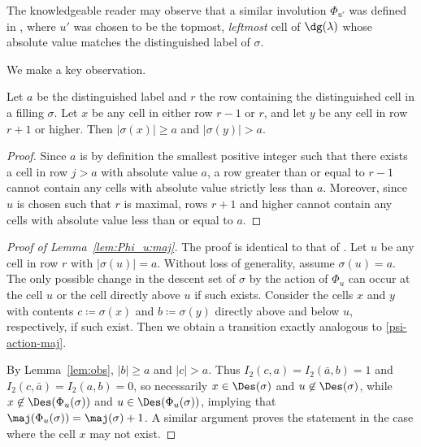 \begin{remark} 
The knowledgeable reader may observe that a similar involution $\Phi_{u'}$ was
defined in \cite[Section 5.2]{HHL05}, where $u'$ was chosen to be the topmost, \emph{leftmost} cell of $\dg(\lambda)$ whose absolute value matches the distinguished label of $\sigma$. 
\end{remark}


We make a key observation. 
\begin{lemma}\label{lem:obs}
Let $a$ be the distinguished label and $r$ the row containing the distinguished cell in a filling $\sigma$. Let $x$ be any cell in either row $r-1$ or $r$, and let $y$ be any cell in row $r+1$ or higher. Then $|\sigma(x)|\geq a$ and $|\sigma(y)|>a$.
\end{lemma}
\begin{proof}
Since $a$ is by definition the smallest positive integer such that there exists a cell in row $j>a$ with absolute value $a$, a row greater than or equal to $r-1$ cannot contain any cells with absolute value strictly less than $a$. Moreover, since $u$ is chosen such that $r$ is maximal, rows $r+1$ and higher cannot contain any cells with absolute value less than or equal to $a$. 
\end{proof}

\begin{proof}[Proof of Lemma~\ref{lem:Phi_u:maj}]
The proof is identical to that of \cite[Lemma 5.2]{HHL05}. Let $u$ be any cell in row $r$ with $|\sigma(u)|=a$. Without loss of generality, assume $\sigma(u)=a$. The only possible change in the descent set of $\sigma$ by the action of $\Phi_u$ can occur at the cell $u$ or the cell directly above $u$ if such exists. 
Consider the cells $x$ and $y$ with contents $c\coloneqq\sigma(x)$ and $b\coloneqq\sigma(y)$ directly above and below $u$, respectively, if such exist. 
Then we obtain a transition exactly analogous to \eqref{psi-action-maj}.

By Lemma~\ref{lem:obs}, $|b| \geq a$ and $|c| > a$. Thus $I_2(c,a)=I_2(\bar{a},b)=1$ and $I_2(c,\bar{a})=I_2(a,b)=0$, so necessarily $x\in\Des(\sigma)$ and $u\not\in\Des(\sigma)$, while $x\not\in\Des(\Phi_u(\sigma))$ and $u\in\Des(\Phi_u(\sigma))$, implying that $\maj(\Phi_u(\sigma))=\maj(\sigma)+1$. A similar argument proves the statement in the case where the cell $x$ may not exist.
\end{proof}

